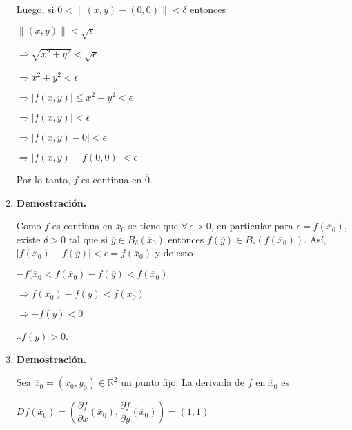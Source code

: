 \documentclass[fleqn]{article}
\begin{document}
\begin{enumerate}
        Luego, si $ 0 < \lVert (x,y) - (0,0) \rVert < \delta $ entonces

        $ \lVert (x,y) \rVert < \sqrt{\epsilon} $

        $ \Longrightarrow \sqrt{x^2 + y^2} < \sqrt{\epsilon} $

        $ \Longrightarrow x^2 + y^2 < \epsilon $

        $ \Longrightarrow \lvert f(x,y) \rvert \leq x^2 + y^2 < \epsilon $

        $ \Longrightarrow \lvert f(x,y) \rvert < \epsilon $

        $ \Longrightarrow \lvert f(x,y) - 0 \rvert < \epsilon $

        $ \Longrightarrow \lvert f(x,y) - f(0,0) \rvert < \epsilon $

        Por lo tanto, $ f $ es continua en $ \overline{0} $.

        \item \textbf{Demostración.}

        Como $ f $ es continua en $ \overline{x}_0 $ se tiene que $ \forall \, \epsilon > 0 $, en particular para $ \epsilon = f(\overline{x}_0) $, existe $ \delta > 0 $ tal que si $ \overline{y} \in B_\delta (\overline{x}_0) $ entonces $ f(\overline{y}) \in B_\epsilon (f(\overline{x}_0)) $. Así, $ \left\lvert f(\overline{x}_0) - f(\overline{y}) \right\rvert < \epsilon = f(\overline{x}_0) $ y de esto

        $ -f(\overline{x}_0 < f(\overline{x}_0) - f(\overline{y}) < f(\overline{x}_0) $

        $ \Longrightarrow f(\overline{x}_0) - f(\overline{y}) < f(\overline{x}_0) $

        $ \Longrightarrow - f(\overline{y}) < 0 $

        $ \therefore f(\overline{y}) > 0 $.

        \item \textbf{Demostración.}

        Sea $ \overline{x}_0 = (x_0,y_0) \in \mathbb{R}^2 $ un punto fijo. La derivada de $ f $ en $ \overline{x}_0 $ es

        $ D f(\overline{x}_0) = \left( \dfrac{\partial f}{\partial x} (\overline{x}_0), \dfrac{\partial f}{\partial y} (\overline{x}_0) \right) = (1,1) $ 
        

\end{enumerate}
\end{document}
